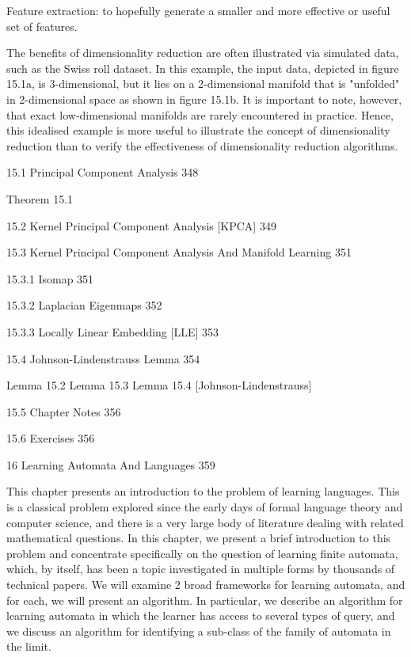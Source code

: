 Feature extraction: to hopefully generate a smaller and more effective or useful set of features.

The benefits of dimensionality reduction are often illustrated via simulated data, such as the Swiss roll dataset. In this example, the input data, depicted in figure 15.1a, is 3-dimensional, but it lies on a 2-dimensional manifold that is "unfolded" in 2-dimensional space as shown in figure 15.1b. It is important to note, however, that exact low-dimensional manifolds are rarely encountered in practice. Hence, this idealised example is more useful to illustrate the concept of dimensionality reduction than to verify the effectiveness of dimensionality reduction algorithms.

15.1 Principal Component Analysis 348

Theorem 15.1

15.2 Kernel Principal Component Analysis [KPCA] 349



15.3 Kernel Principal Component Analysis And Manifold Learning 351



15.3.1 Isomap 351



15.3.2 Laplacian Eigenmaps 352



15.3.3 Locally Linear Embedding [LLE] 353



15.4 Johnson-Lindenstrauss Lemma 354

Lemma 15.2
Lemma 15.3
Lemma 15.4 [Johnson-Lindenstrauss]

15.5 Chapter Notes 356



15.6 Exercises 356



16 Learning Automata And Languages 359

This chapter presents an introduction to the problem of learning languages. This is a classical problem explored since the early days of formal language theory and computer science, and there is a very large body of literature dealing with related mathematical questions. In this chapter, we present a brief introduction to this problem and concentrate specifically on the question of learning finite automata, which, by itself, has been a topic investigated in multiple forms by thousands of technical papers. We will examine 2 broad frameworks for learning automata, and for each, we will present an algorithm. In particular, we describe an algorithm for learning automata in which the learner has access to several types of query, and we discuss an algorithm for identifying a sub-class of the family of automata in the limit.

